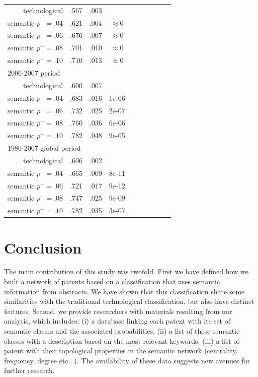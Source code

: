 \documentclass[12pt,twoside,a4paper]{article}
\begin{document}
\begin{table}[!ht]
\begin{tabular}{@{}rccccccccc@{}}
technological & .567 &.003&\\
semantic $p^{-} = .04$ & .621 &.004 & $\approx 0$\\
semantic $p^{-} = .06$ & .676 &.007 & $\approx 0$\\
semantic $p^{-} = .08$ & .701 &.010 & $\approx 0$\\
semantic $p^{-} = .10$ & .710 &.013 & $\approx 0$\\
\multicolumn{4}{l}{2006-2007 period} \\
technological & .600 &.007&\\
semantic $p^{-} = .04$ & .683 &.016 & 1e-06\\
semantic $p^{-} = .06$ & .732 &.025 & 2e-07\\
semantic $p^{-} = .08$ & .760 &.036 & 6e-06\\
semantic $p^{-} = .10$ & .782 &.048 &9e-05\\
\multicolumn{4}{l}{1980-2007 global period} \\
technological & .606 &.002&\\
semantic $p^{-} = .04$ & .665 &.009 & 8e-11\\
semantic $p^{-} = .06$ & .721 &.017 & 9e-12\\
semantic $p^{-} = .08$ & .747 &.025 & 9e-09\\
semantic $p^{-} = .10$ & .782 &.035 & 3e-07\\
\bottomrule
\end{tabular}
\end{table}



\section{Conclusion \label{discussion}}

The main contribution of this study was twofold. First we have defined how we built a network of patents based on a classification that uses semantic information from abstracts. We have shown that this classification share some similarities with the traditional technological classification, but also have distinct features. Second, we provide researchers with materials resulting from our analysis, which includes: (i) a database linking each patent with its set of semantic classes and the associated probabilities; (ii) a list of these semantic classes with a description based on the most relevant keywords; (iii) a list of patent with their topological properties in the semantic network (centrality, frequency, degree etc...). The availability of these data suggests new avenues for further research.
\end{document}
